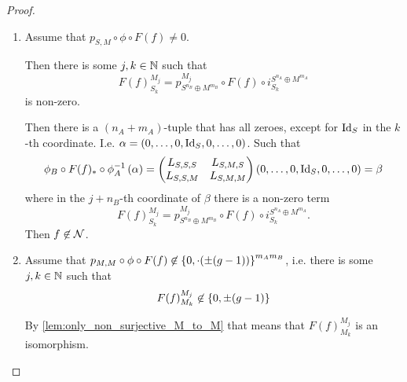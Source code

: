 \begin{proof}
\begin{enumerate}
{\begin{enumerate}
{                    Then \( f \not\in \Nc \). 
                }
                \item {
                    Assume that \( p_{S, M} \circ \phi \circ F(f) \neq 0 \).

                    Then there is some \( j, k \in {\mathbb{N}} \) such that
                    \[
                        F(f)_{S_k}^{M_j} = p_{S^{n_B} \oplus M^{m_B}}^{M_j} \circ F(f) \circ i_{S_k}^{S^{n_A} \oplus M^{m_A}}
                    \]
                    is non-zero.

                    Then there is a \( (n_A + m_A) \)-tuple that has all zeroes, except for \( \operatorname{Id}_S \) in the \( k \)-th coordinate. I.e. \( \alpha = \left( 0, \dots, 0, \operatorname{Id}_S, 0, \dots, 0 \right) \). Such that
                    \[
                        \phi_B \circ F(f)_* \circ \phi_A^{-1} \left( \alpha \right)
                        =
                        \begin{pmatrix}
                            L_{S, S, S} & L_{S, M, S} \\
                            L_{S, S, M} & L_{S, M, M}
                        \end{pmatrix}
                        \left( 0, \dots, 0, \operatorname{Id}_S, 0, \dots, 0 \right)
                        = \beta
                    \]
                    where in the \( j + n_B \)-th coordinate of \( \beta \) there is a non-zero term
                    \[
                        F(f)_{S_k}^{M_j} = p_{S^{n_B} \oplus M^{m_B}}^{M_j} \circ F(f) \circ i_{S_k}^{S^{n_A} \oplus M^{m_A}}.
                    \]
                    Then \( f \not\in \Nc \).
                }
                \item {
                    Assume that \( p_{M, M} \circ \phi \circ F(f) \not\in \left\{ 0, \cdot(\pm (g - 1)) \right\}^{m_A m_B} \), i.e. there is some \( j, k \in {\mathbb{N}} \) such that
                    \[
                        F(f)_{M_k}^{M_j} \not\in \left\{ 0, \pm(g - 1) \right\}
                    \]

                    By \autoref{lem:only_non_surjective_M_to_M} that means that \( F(f)_{M_k}^{M_j} \) is an isomorphism.

}
\end{enumerate}}
\end{enumerate}
\end{proof}
